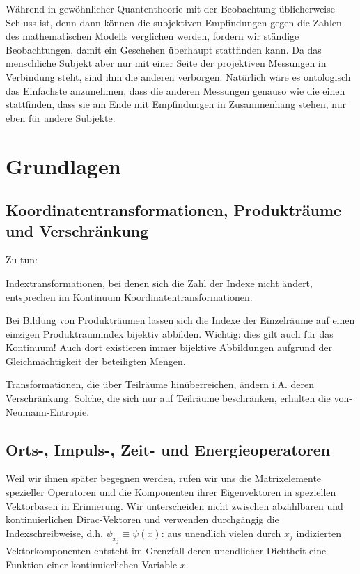 \documentclass[12pt]{article}
\begin{document}
Während in gewöhnlicher Quantentheorie mit der Beobachtung üblicherweise Schluss ist, denn dann können die subjektiven Empfindungen gegen die Zahlen des mathematischen Modells verglichen werden, fordern wir ständige Beobachtungen, damit ein Geschehen überhaupt stattfinden kann. Da das menschliche Subjekt aber nur mit einer Seite der projektiven Messungen in Verbindung steht, sind ihm die anderen verborgen. Natürlich wäre es ontologisch das Einfachste anzunehmen, dass die anderen Messungen genauso wie die einen stattfinden, dass sie am Ende mit Empfindungen in Zusammenhang stehen, nur eben für andere Subjekte. 

\section{Grundlagen}

\subsection{Koordinatentransformationen, Produkträume und Verschränkung}

Zu tun: 

Indextransformationen, bei denen sich die Zahl der Indexe nicht ändert, entsprechen im Kontinuum Koordinatentransformationen. 

Bei Bildung von Produkträumen lassen sich die Indexe der Einzelräume auf einen einzigen Produktraumindex bijektiv abbilden. Wichtig: dies gilt auch für das Kontinuum! Auch dort existieren immer bijektive Abbildungen aufgrund der Gleichmächtigkeit der beteiligten Mengen.

Transformationen, die über Teilräume hinüberreichen, ändern i.A. deren Verschränkung. Solche, die sich nur auf Teilräume beschränken, erhalten die von-Neumann-Entropie.

\subsection{Orts-, Impuls-, Zeit- und Energieoperatoren}

Weil wir ihnen später begegnen werden, rufen wir uns die Matrixelemente spezieller Operatoren und die Komponenten ihrer Eigenvektoren in speziellen Vektorbasen in Erinnerung. Wir unterscheiden nicht zwischen abzählbaren und kontinuierlichen Dirac-Vektoren und verwenden durchgängig die Indexschreibweise, d.h. $\psi_{x_j} \equiv \psi(x)$: aus unendlich vielen durch $x_j$ indizierten Vektorkomponenten entsteht im Grenzfall deren unendlicher Dichtheit eine Funktion einer kontinuierlichen Variable $x$. 
\end{document}
